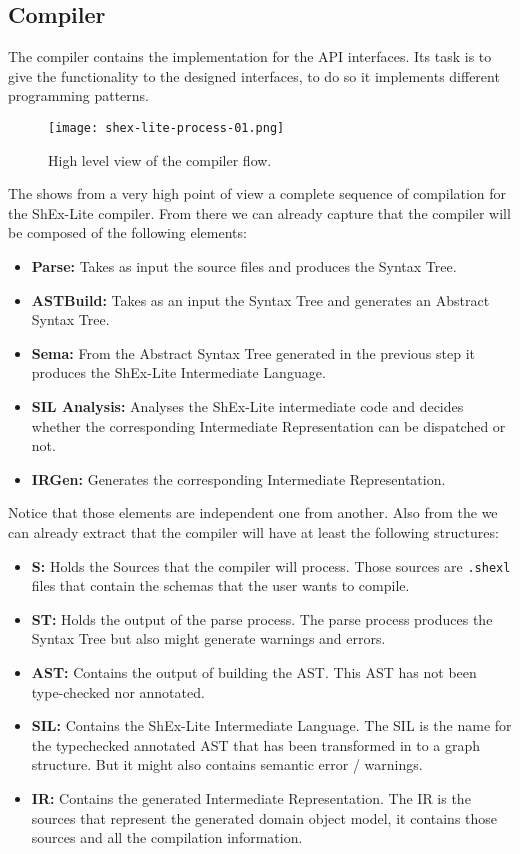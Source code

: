\subsection{Compiler}
The compiler contains the implementation for the API interfaces. Its task is to give the
functionality to the designed interfaces, to do so it implements different programming
patterns.

\begin{figure}[h]
    \texttt{[image: shex-lite-process-01.png]}
    \caption[High level view of the compiler flow]{High level view of the compiler flow.}
\end{figure}

The  shows from a very high point of view a complete sequence of compilation
for the ShEx-Lite compiler. From there we can already capture that the compiler will be
composed of the following elements: 

\begin{itemize}
    \item \textbf{Parse:} Takes as input the source files and produces the Syntax Tree. 
    \item \textbf{ASTBuild:} Takes as an input the Syntax Tree and generates an Abstract Syntax Tree.
    \item \textbf{Sema:} From the Abstract Syntax Tree generated in the previous step it produces the ShEx-Lite Intermediate Language.
    \item \textbf{SIL Analysis:} Analyses the ShEx-Lite intermediate code and decides whether the corresponding Intermediate Representation can be dispatched or not.
    \item \textbf{IRGen:} Generates the corresponding Intermediate Representation.
\end{itemize}

Notice that those elements are independent one from another. Also from the 
we can already extract that the compiler will have at least the following structures:

\begin{itemize}
    \item \textbf{S:} Holds the Sources that the compiler will process. Those sources are \texttt{.shexl} files that contain the schemas that the user wants to compile.
    \item \textbf{ST:} Holds the output of the parse process. The parse process produces the Syntax Tree but also might generate warnings and errors. 
    \item \textbf{AST:} Contains the output of building the AST. This AST has not been type-checked nor annotated. 
    \item \textbf{SIL:} Contains the ShEx-Lite Intermediate Language. The SIL is the name for the typechecked annotated AST that has been transformed in to a graph structure. But it might also contains semantic error / warnings. 
    \item \textbf{IR:} Contains the generated Intermediate Representation. The IR is the sources that represent the generated domain object model, it contains those sources and all the compilation information. 
\end{itemize}

